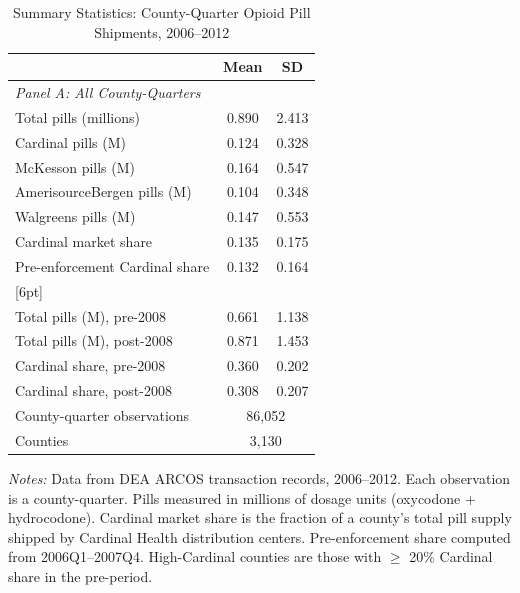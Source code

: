 \begin{table}[htbp]
\centering
\caption{Summary Statistics: County-Quarter Opioid Pill Shipments, 2006--2012}
\label{tab:summary}
\begin{tabular}{lcc}
\hline\hline
& Mean & SD \\
\hline
\multicolumn{3}{l}{\textit{Panel A: All County-Quarters}} \\[3pt]
Total pills (millions) & 0.890 & 2.413 \\
Cardinal pills (M) & 0.124 & 0.328 \\
McKesson pills (M) & 0.164 & 0.547 \\
AmerisourceBergen pills (M) & 0.104 & 0.348 \\
Walgreens pills (M) & 0.147 & 0.553 \\
Cardinal market share & 0.135 & 0.175 \\
Pre-enforcement Cardinal share & 0.132 & 0.164 \\
{}[6pt]
\multicolumn{3}{l}{\textit{Panel B: High-Cardinal Counties ($\geq$ 20\% pre-share)}} \\[3pt]
Total pills (M), pre-2008 & 0.661 & 1.138 \\
Total pills (M), post-2008 & 0.871 & 1.453 \\
Cardinal share, pre-2008 & 0.360 & 0.202 \\
Cardinal share, post-2008 & 0.308 & 0.207 \\
\hline
County-quarter observations & \multicolumn{2}{c}{86,052} \\
Counties & \multicolumn{2}{c}{3,130} \\
\hline\hline
\end{tabular}
\par\vspace{3pt}\raggedright\small
\textit{Notes:} Data from DEA ARCOS transaction records, 2006--2012. Each observation is a county-quarter. Pills measured in millions of dosage units (oxycodone + hydrocodone). Cardinal market share is the fraction of a county's total pill supply shipped by Cardinal Health distribution centers. Pre-enforcement share computed from 2006Q1--2007Q4. High-Cardinal counties are those with $\geq$ 20\% Cardinal share in the pre-period.
\end{table}
